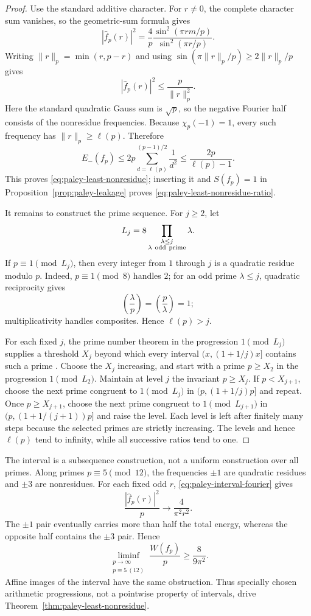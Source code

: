 \documentclass[11pt]{article}
\begin{document}
\begin{proof}
Use the standard additive character.  For $r\ne0$, the complete character
sum vanishes, so the geometric-sum formula gives
\begin{equation}
 |\widehat f_p(r)|^2
 =\frac4p\frac{\sin^2(\pi rm/p)}{\sin^2(\pi r/p)}.
 \label{eq:paley-interval-fourier}
\end{equation}
Writing $\|r\|_p=\min(r,p-r)$ and using
$\sin(\pi\|r\|_p/p)\ge2\|r\|_p/p$ gives
\[
 |\widehat f_p(r)|^2\le\frac{p}{\|r\|_p^2}.
\]
Here the standard quadratic Gauss sum is $\sqrt p$, so the negative Fourier
half consists of the nonresidue frequencies.  Because $\chi_p(-1)=1$, every
such frequency has $\|r\|_p\ge\ell(p)$.  Therefore
\[
 E_-(f_p)\le2p\sum_{d=\ell(p)}^{(p-1)/2}\frac1{d^2}
 \le\frac{2p}{\ell(p)-1}.
\]
This proves \eqref{eq:paley-least-nonresidue}; inserting it and $S(f_p)=1$
in Proposition~\ref{prop:paley-leakage} proves
\eqref{eq:paley-least-nonresidue-ratio}.

It remains to construct the prime sequence.  For $j\ge2$, let
\[
 L_j=8\prod_{\substack{\lambda\le j\\
                       \lambda\ {\rm odd\ prime}}}\lambda.
\]
If $p\equiv1\pmod{L_j}$, then every integer from $1$ through $j$ is a
quadratic residue modulo $p$.  Indeed, $p\equiv1\pmod8$ handles $2$; for an
odd prime $\lambda\le j$, quadratic reciprocity gives
\[
 \left(\frac{\lambda}{p}\right)
 =\left(\frac p\lambda\right)=1;
\]
multiplicativity handles composites.  Hence $\ell(p)>j$.

For each fixed $j$, the prime number theorem in the progression
$1\pmod{L_j}$ supplies a threshold $X_j$ beyond which every interval
$(x,(1+1/j)x]$ contains such a prime \cite{davenport}.  Choose the $X_j$
increasing, and start with a prime $p\ge X_2$ in the progression
$1\pmod{L_2}$.  Maintain at level $j$ the invariant $p\ge X_j$.  If
$p<X_{j+1}$, choose the next prime congruent to $1\pmod{L_j}$ in
$(p,(1+1/j)p]$ and repeat.  Once $p\ge X_{j+1}$, choose the next prime
congruent to $1\pmod{L_{j+1}}$ in
$(p,(1+1/(j+1))p]$ and raise the level.  Each level is left after finitely
many steps because the selected primes are strictly increasing.  The levels
and hence $\ell(p)$ tend to infinity, while all successive ratios tend to
one.
\end{proof}

The interval is a subsequence construction, not a uniform construction over
all primes.  Along primes $p\equiv5\pmod{12}$, the frequencies $\pm1$ are
quadratic residues and $\pm3$ are nonresidues.  For each fixed odd $r$,
\eqref{eq:paley-interval-fourier} gives
\[
 \frac{|\widehat f_p(r)|^2}{p}\longrightarrow\frac4{\pi^2r^2}.
\]
The $\pm1$ pair eventually carries more than half the total energy, whereas
the opposite half contains the $\pm3$ pair.  Hence
\begin{equation}
 \liminf_{\substack{p\to\infty\\p\equiv5\ (12)}}
 \frac{W(f_p)}p\ge\frac8{9\pi^2}.
 \label{eq:paley-interval-nonuniform}
\end{equation}
Affine images of the interval have the same obstruction.  Thus specially
chosen arithmetic progressions, not a pointwise property of intervals, drive
Theorem~\ref{thm:paley-least-nonresidue}.
\end{document}
